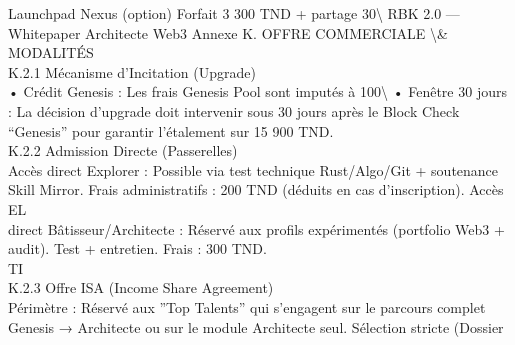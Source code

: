 \documentclass[12pt,landscape,a4paper]{article}
\begin{document}
Launchpad Nexus (option)            Forfait 3 300 TND + partage 30\textbackslash{}%
RBK 2.0 — Whitepaper Architecte Web3                                                                         Annexe K. OFFRE COMMERCIALE \textbackslash{}& MODALITÉS\\
\vspace{0.5em}
\vspace{0.5em}
K.2.1 Mécanisme d’Incitation (Upgrade)\\
• Crédit Genesis : Les frais Genesis Pool sont imputés à 100\textbackslash{}%
\vspace{0.5em}
• Fenêtre 30 jours : La décision d’upgrade doit intervenir sous 30 jours après le Block Check “Genesis” pour garantir l’étalement sur 15 900 TND.\\
\vspace{0.5em}
\vspace{0.5em}
K.2.2 Admission Directe (Passerelles)\\
Accès direct Explorer : Possible via test technique Rust/Algo/Git + soutenance Skill Mirror. Frais administratifs : 200 TND (déduits en cas d’inscription). Accès\\
\vspace{0.5em}
\vspace{0.5em}
\vspace{0.5em}
\vspace{0.5em}
EL\\
direct Bâtisseur/Architecte : Réservé aux profils expérimentés (portfolio Web3 + audit). Test + entretien. Frais : 300 TND.\\
\vspace{0.5em}
\vspace{0.5em}
\vspace{0.5em}
\vspace{0.5em}
TI\\
K.2.3 Offre ISA (Income Share Agreement)\\
Périmètre : Réservé aux ”Top Talents” qui s’engagent sur le parcours complet Genesis → Architecte ou sur le module Architecte seul. Sélection stricte (Dossier\\
\vspace{0.5em}
\vspace{0.5em}
\vspace{0.5em}
\vspace{0.5em}
\end{document}
